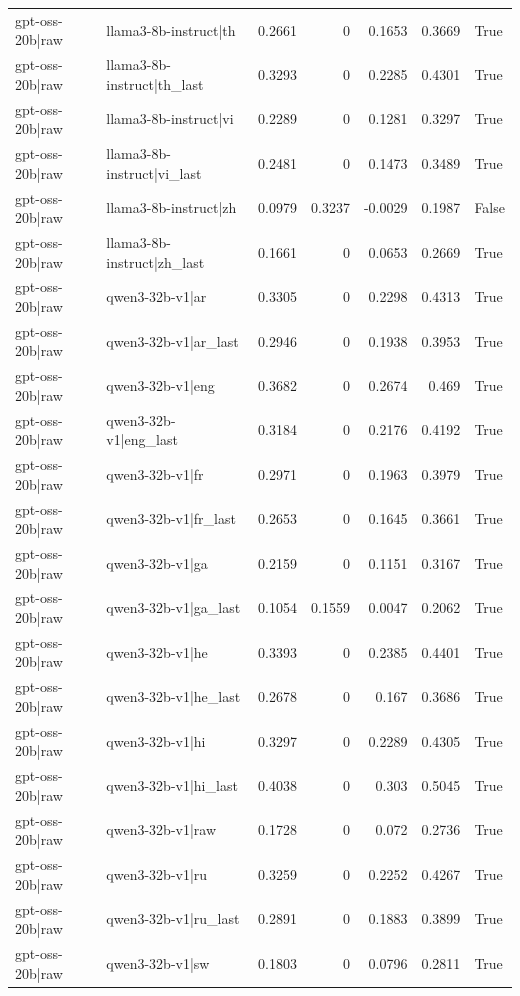 \begin{table}
\begin{tabular}{l l r r r r l}
gpt-oss-20b|raw & llama3-8b-instruct|th & 0.2661 & 0 & 0.1653 & 0.3669 & True \\
gpt-oss-20b|raw & llama3-8b-instruct|th_last & 0.3293 & 0 & 0.2285 & 0.4301 & True \\
gpt-oss-20b|raw & llama3-8b-instruct|vi & 0.2289 & 0 & 0.1281 & 0.3297 & True \\
gpt-oss-20b|raw & llama3-8b-instruct|vi_last & 0.2481 & 0 & 0.1473 & 0.3489 & True \\
gpt-oss-20b|raw & llama3-8b-instruct|zh & 0.0979 & 0.3237 & -0.0029 & 0.1987 & False \\
gpt-oss-20b|raw & llama3-8b-instruct|zh_last & 0.1661 & 0 & 0.0653 & 0.2669 & True \\
gpt-oss-20b|raw & qwen3-32b-v1|ar & 0.3305 & 0 & 0.2298 & 0.4313 & True \\
gpt-oss-20b|raw & qwen3-32b-v1|ar_last & 0.2946 & 0 & 0.1938 & 0.3953 & True \\
gpt-oss-20b|raw & qwen3-32b-v1|eng & 0.3682 & 0 & 0.2674 & 0.469 & True \\
gpt-oss-20b|raw & qwen3-32b-v1|eng_last & 0.3184 & 0 & 0.2176 & 0.4192 & True \\
gpt-oss-20b|raw & qwen3-32b-v1|fr & 0.2971 & 0 & 0.1963 & 0.3979 & True \\
gpt-oss-20b|raw & qwen3-32b-v1|fr_last & 0.2653 & 0 & 0.1645 & 0.3661 & True \\
gpt-oss-20b|raw & qwen3-32b-v1|ga & 0.2159 & 0 & 0.1151 & 0.3167 & True \\
gpt-oss-20b|raw & qwen3-32b-v1|ga_last & 0.1054 & 0.1559 & 0.0047 & 0.2062 & True \\
gpt-oss-20b|raw & qwen3-32b-v1|he & 0.3393 & 0 & 0.2385 & 0.4401 & True \\
gpt-oss-20b|raw & qwen3-32b-v1|he_last & 0.2678 & 0 & 0.167 & 0.3686 & True \\
gpt-oss-20b|raw & qwen3-32b-v1|hi & 0.3297 & 0 & 0.2289 & 0.4305 & True \\
gpt-oss-20b|raw & qwen3-32b-v1|hi_last & 0.4038 & 0 & 0.303 & 0.5045 & True \\
gpt-oss-20b|raw & qwen3-32b-v1|raw & 0.1728 & 0 & 0.072 & 0.2736 & True \\
gpt-oss-20b|raw & qwen3-32b-v1|ru & 0.3259 & 0 & 0.2252 & 0.4267 & True \\
gpt-oss-20b|raw & qwen3-32b-v1|ru_last & 0.2891 & 0 & 0.1883 & 0.3899 & True \\
gpt-oss-20b|raw & qwen3-32b-v1|sw & 0.1803 & 0 & 0.0796 & 0.2811 & True \\

\end{tabular}
\end{table}
